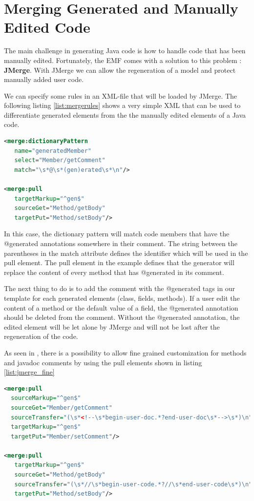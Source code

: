 \section{Merging Generated and Manually Edited Code}
The main challenge in generating Java code is how to handle code that has been manually edited. Fortunately, the EMF comes with a solution to this problem : \textbf{JMerge}\cite{JMERGEFAQ}. With JMerge we can allow the regeneration of a model and protect manually added user code. 

We can specify some rules in an XML-file that will be loaded by JMerge.  The following listing \ref{list:mergerules} shows a very simple XML that can be used to differentiate generated elements from the the manually edited elements of a Java code. 

\begin{lstlisting}[language=xml, caption = Example JMerge Rule, label=list:mergerules]
<merge:dictionaryPattern
   name="generatedMember" 
   select="Member/getComment" 
   match="\s*@\s*(gen)erated\s*\n"/>

<merge:pull 
   targetMarkup="^gen$"
   sourceGet="Method/getBody"
   targetPut="Method/setBody"/>
\end{lstlisting}

In this case, the dictionary pattern will match code members that have the @generated annotations somewhere in their comment. The string between the parentheses in the match attribute defines the identifier which will be used in the pull element. The pull element in the example defines that the generator will replace the content of every method that has @generated in its comment.

The next thing to do is to add the comment with the @generated tags in our template for each generated elements (class, fields, methods). 
If a user edit the content of a method or the default value of a field, the @generated annotation should be deleted from the comment. Without the @generated annotation, the edited element will be let alone by JMerge and will not be lost after the regeneration of the code.  

As seen in \cite{APJMERGE}, there is a possibility to allow fine grained customization for methods and javadoc comments by using the pull elements shown in listing \ref{list:jmerge_fine}
\begin{lstlisting}[language=xml, caption=JMerge Example: fine grained customization for javadoc comments and methods, label = list:jmerge_fine]
<merge:pull 
  sourceMarkup="^gen$"
  sourceGet="Member/getComment"
  sourceTransfer="(\s*<!--\s*begin-user-doc.*?end-user-doc\s*-->\s*)\n"
  targetMarkup="^gen$"
  targetPut="Member/setComment"/>
  
<merge:pull 
   targetMarkup="^gen$"
   sourceGet="Method/getBody"
   sourceTransfer="(\s*//\s*begin-user-code.*?//\s*end-user-code\s*)\n"
   targetPut="Method/setBody"/>

\end{lstlisting}

